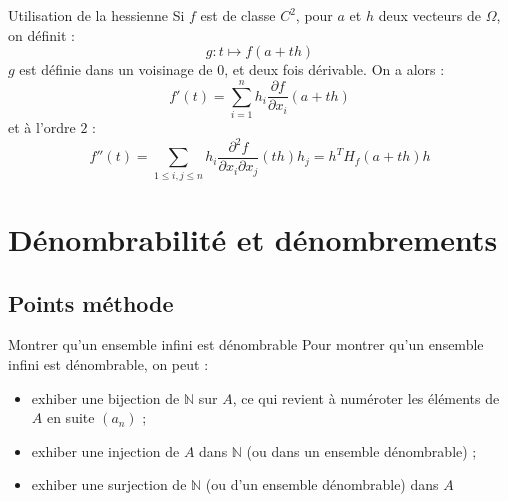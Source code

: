 \documentclass[french]{book}
\newcommand{\N}{\mathbb{N}}
\theoremstyle{plain}
\theoremstyle{definition}
\theoremstyle{remark}
\begin{document}
\begin{AS}{Utilisation de la hessienne}
	Si $f$ est de classe $C^2$, pour $a$ et $h$ deux vecteurs de $\Omega$, on définit : $$g:t\mapsto f(a+th)$$ $g$ est définie dans un voisinage de $0$, et deux fois dérivable. On a alors : $$f'(t)=\sum_{i=1}^{n}h_i\frac{\partial f}{\partial x_i}(a+th)$$ et à l'ordre $2$ : $$f''(t)=\sum_{1\leqslant i,j\leqslant n}h_i\frac{\partial^2f}{\partial x_i\partial x_j}(th)h_j=h^TH_f(a+th)h$$
\end{AS}


\chapter{Dénombrabilité et dénombrements}
\localtableofcontents
\section{Points méthode}
\begin{PM}{Montrer qu'un ensemble infini est dénombrable}
Pour montrer qu'un ensemble infini est dénombrable, on peut :
\begin{itemize}
	\item exhiber une bijection de $\N$ sur $A$, ce qui revient à numéroter les éléments de $A$ en suite $(a_n)$ ;
	\item exhiber une injection de $A$ dans $\N$ (ou dans un ensemble dénombrable) ;
	\item exhiber une surjection de $\N$ (ou d'un ensemble dénombrable) dans $A$
\end{itemize}
\end{PM}
\end{document}
